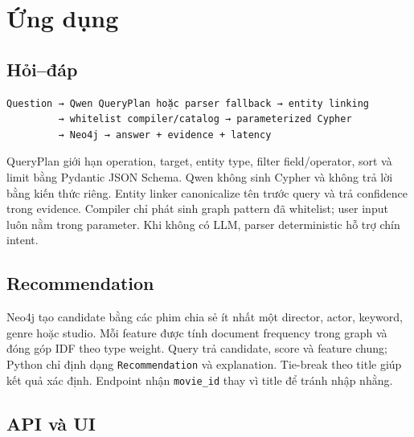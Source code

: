 \chapter{Ứng dụng}

\section{Hỏi–đáp}

\begin{Verbatim}[fontsize=\small,breaklines=true,frame=single]
Question → Qwen QueryPlan hoặc parser fallback → entity linking
         → whitelist compiler/catalog → parameterized Cypher
         → Neo4j → answer + evidence + latency
\end{Verbatim}

QueryPlan giới hạn operation, target, entity type, filter field/operator, sort và
limit bằng Pydantic JSON Schema. Qwen không sinh Cypher và không trả lời bằng kiến
thức riêng. Entity linker canonicalize tên trước query và trả confidence trong
evidence. Compiler chỉ phát sinh graph pattern đã whitelist; user input luôn nằm
trong parameter. Khi không có LLM, parser deterministic hỗ trợ chín intent.

\section{Recommendation}

Neo4j tạo candidate bằng các phim chia sẻ ít nhất một director, actor, keyword,
genre hoặc studio. Mỗi feature được tính document frequency trong graph và đóng
góp IDF theo type weight. Query trả candidate, score và feature chung; Python chỉ
định dạng \texttt{Recommendation} và explanation. Tie-break theo title giúp kết quả xác
định. Endpoint nhận \texttt{movie\_id} thay vì title để tránh nhập nhằng.

\section{API và UI}

